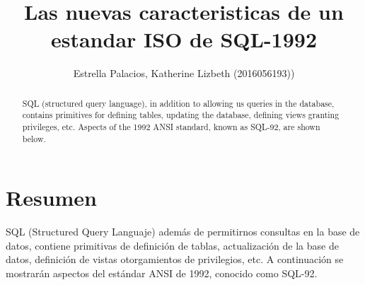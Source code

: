 \documentclass[preprint,12pt]{elsarticle}
\begin{document}
	
	\begin{frontmatter}

		\title{\huge Las nuevas caracteristicas de un estandar ISO de SQL-1992}
		
		\author{Estrella Palacios, Katherine Lizbeth              (2016056193))}
		
		\address{Tacna, Perú}
		
		\begin{abstract}
SQL (structured query language), in addition to allowing us queries in the database, contains primitives for defining tables, updating the database, defining views granting privileges, etc. Aspects of the 1992 ANSI standard, known as SQL-92, are shown below.
		\end{abstract}
\end{frontmatter}
	
	\section{Resumen}

SQL (Structured Query Languaje) además de permitirnos consultas en la base de datos, contiene primitivas de definición de tablas, actualización de la base de datos, definición de vistas otorgamientos de privilegios, etc. A continuación se mostrarán aspectos del estándar ANSI de 1992, conocido como SQL-92.

\end{document}
